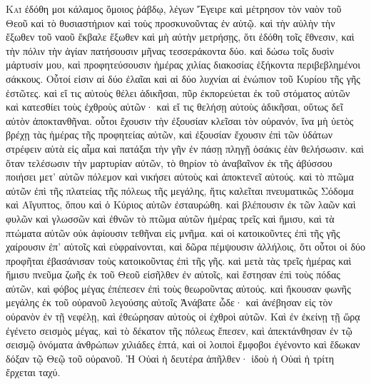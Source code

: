 \begin{pages}
    \begin{Rightside}
        \beginnumbering
		\renewcommand{\LettrineFontHook}{\PHtitl}
		\lettrine[lines=3]{Κ}{αὶ} ἐδόθη μοι κάλαμος ὅμοιος ῥάβδῳ, λέγων Ἔγειρε καὶ μέτρησον τὸν ναὸν τοῦ Θεοῦ καὶ τὸ θυσιαστήριον καὶ τοὺς προσκυνοῦντας ἐν αὐτῷ. καὶ τὴν αὐλὴν τὴν ἔξωθεν τοῦ ναοῦ ἔκβαλε ἔξωθεν καὶ μὴ αὐτὴν μετρήσῃς, ὅτι ἐδόθη τοῖς ἔθνεσιν, καὶ τὴν πόλιν τὴν ἁγίαν πατήσουσιν μῆνας τεσσεράκοντα δύο.
		\pend
		\pstart
		καὶ δώσω τοῖς δυσὶν μάρτυσίν μου, καὶ προφητεύσουσιν ἡμέρας χιλίας διακοσίας ἑξήκοντα περιβεβλημένοι σάκκους. Οὗτοί εἰσιν αἱ δύο ἐλαῖαι καὶ αἱ δύο λυχνίαι αἱ ἐνώπιον τοῦ Κυρίου τῆς γῆς ἑστῶτες. καὶ εἴ τις αὐτοὺς θέλει ἀδικῆσαι, πῦρ ἐκπορεύεται ἐκ τοῦ στόματος αὐτῶν καὶ κατεσθίει τοὺς ἐχθροὺς αὐτῶν· καὶ εἴ τις θελήσῃ αὐτοὺς ἀδικῆσαι, οὕτως δεῖ αὐτὸν ἀποκτανθῆναι. 
		\pend
		\pstart
		οὗτοι ἔχουσιν τὴν ἐξουσίαν κλεῖσαι τὸν οὐρανόν, ἵνα μὴ ὑετὸς βρέχῃ τὰς ἡμέρας τῆς προφητείας αὐτῶν, καὶ ἐξουσίαν ἔχουσιν ἐπὶ τῶν ὑδάτων στρέφειν αὐτὰ εἰς αἷμα καὶ πατάξαι τὴν γῆν ἐν πάσῃ πληγῇ ὁσάκις ἐὰν θελήσωσιν. καὶ ὅταν τελέσωσιν τὴν μαρτυρίαν αὐτῶν, τὸ θηρίον τὸ ἀναβαῖνον ἐκ τῆς ἀβύσσου ποιήσει μετ’ αὐτῶν πόλεμον καὶ νικήσει αὐτοὺς καὶ ἀποκτενεῖ αὐτούς. 
		\pend
		\pstart
		καὶ τὸ πτῶμα αὐτῶν ἐπὶ τῆς πλατείας τῆς πόλεως τῆς μεγάλης, ἥτις καλεῖται πνευματικῶς Σόδομα καὶ Αἴγυπτος, ὅπου καὶ ὁ Κύριος αὐτῶν ἐσταυρώθη. καὶ βλέπουσιν ἐκ τῶν λαῶν καὶ φυλῶν καὶ γλωσσῶν καὶ ἐθνῶν τὸ πτῶμα αὐτῶν ἡμέρας τρεῖς καὶ ἥμισυ, καὶ τὰ πτώματα αὐτῶν οὐκ ἀφίουσιν τεθῆναι εἰς μνῆμα. 
		\pend
		\pstart
		καὶ οἱ κατοικοῦντες ἐπὶ τῆς γῆς χαίρουσιν ἐπ’ αὐτοῖς καὶ εὐφραίνονται, καὶ δῶρα πέμψουσιν ἀλλήλοις, ὅτι οὗτοι οἱ δύο προφῆται ἐβασάνισαν τοὺς κατοικοῦντας ἐπὶ τῆς γῆς. καὶ μετὰ τὰς τρεῖς ἡμέρας καὶ ἥμισυ πνεῦμα ζωῆς ἐκ τοῦ Θεοῦ εἰσῆλθεν ἐν αὐτοῖς, καὶ ἔστησαν ἐπὶ τοὺς πόδας αὐτῶν, καὶ φόβος μέγας ἐπέπεσεν ἐπὶ τοὺς θεωροῦντας αὐτούς. 
		\pend
		\pstart
		καὶ ἤκουσαν φωνῆς μεγάλης ἐκ τοῦ οὐρανοῦ λεγούσης αὐτοῖς Ἀνάβατε ὧδε· καὶ ἀνέβησαν εἰς τὸν οὐρανὸν ἐν τῇ νεφέλῃ, καὶ ἐθεώρησαν αὐτοὺς οἱ ἐχθροὶ αὐτῶν. Καὶ ἐν ἐκείνῃ τῇ ὥρᾳ ἐγένετο σεισμὸς μέγας, καὶ τὸ δέκατον τῆς πόλεως ἔπεσεν, καὶ ἀπεκτάνθησαν ἐν τῷ σεισμῷ ὀνόματα ἀνθρώπων χιλιάδες ἑπτά, καὶ οἱ λοιποὶ ἔμφοβοι ἐγένοντο καὶ ἔδωκαν δόξαν τῷ Θεῷ τοῦ οὐρανοῦ. Ἡ Οὐαὶ ἡ δευτέρα ἀπῆλθεν· ἰδοὺ ἡ Οὐαὶ ἡ τρίτη ἔρχεται ταχύ. 

\end{Rightside}
\end{pages}
